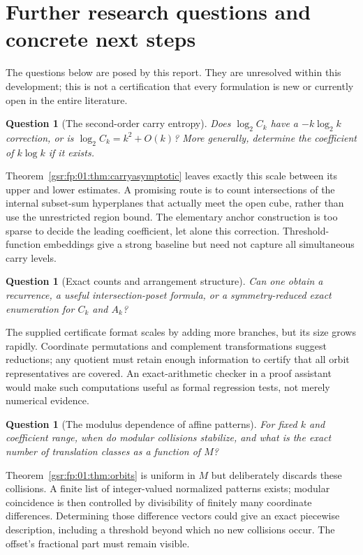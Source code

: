 \documentclass[11pt,letterpaper]{article}
\numberwithin{equation}{section}
\newtheorem{question}[theorem]{Question}
\theoremstyle{definition}
\theoremstyle{remark}
\newcommand{\1}{\mathbf 1}
\newcommand{\srctag}[1]{\texorpdfstring{\enspace\textup{[#1]}}{ [#1]}}
\newcommand{\srcnote}[2]{\par\noindent{\small\textit{Source #1, delivered #2.}}\par}
\begin{document}
\section[{Further research questions and concrete next steps\srctag{01}}]{Further research questions and concrete next steps}\label{gsr:fz:01:sec:d15}\label{gsr:fz:01:sec:questions}
\srcnote{01}{Section 15}

The questions below are posed by this report. They are unresolved within
this development; this is not a certification that every formulation is
new or currently open in the entire literature.

\begin{question}[The second-order carry entropy]
Does $\log_2C_k$ have a $-k\log_2k$ correction, or is
$\log_2C_k=k^2+O(k)$? More generally, determine the coefficient of
$k\log k$ if it exists.
\end{question}
Theorem~\ref{gsr:fp:01:thm:carryasymptotic} leaves exactly this scale between its
upper and lower estimates. A promising route is to count intersections
of the internal subset-sum hyperplanes that actually meet the open cube,
rather than use the unrestricted region bound. The elementary anchor
construction is too sparse to decide the leading coefficient, let alone
this correction. Threshold-function embeddings give a strong baseline
but need not capture all simultaneous carry levels.

\begin{question}[Exact counts and arrangement structure]
Can one obtain a recurrence, a useful intersection-poset formula, or a
symmetry-reduced exact enumeration for $C_k$ and $A_k$?
\end{question}
The supplied certificate format scales by adding more branches, but its
size grows rapidly. Coordinate permutations and complement transformations
suggest reductions; any quotient must retain enough information to certify
that all orbit representatives are covered. An exact-arithmetic checker
in a proof assistant would make such computations useful as formal
regression tests, not merely numerical evidence.

\begin{question}[The modulus dependence of affine patterns]
For fixed $k$ and coefficient range, when do modular collisions stabilize,
and what is the exact number of translation classes as a function of $M$?
\end{question}
Theorem~\ref{gsr:fp:01:thm:orbits} is uniform in $M$ but deliberately discards these
collisions. A finite list of integer-valued normalized patterns exists;
modular coincidence is then controlled by divisibility of finitely many
coordinate differences. Determining those difference vectors could give
an exact piecewise description, including a threshold beyond which no
new collisions occur. The offset's fractional part must remain visible.
\end{document}
